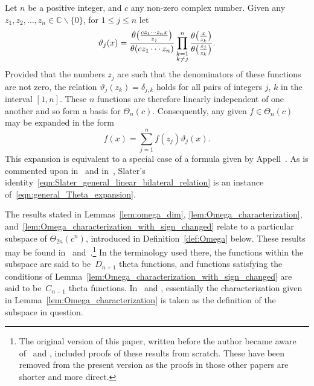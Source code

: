 \documentclass[10pt,a4paper]{amsart}
\numberwithin{equation}{section}
\newcommand{\C}{\mathbb{C}}
\begin{document}
\begin{Remark} \label{rmk:Slater_general_linear_bilateral_relation}
Let $n$ be a positive integer, and $c$ any non-zero complex number. Given any $z_1,z_2,\dots,z_n \in \C \backslash\{0\}$, for $1 \leq j \leq n$ let
\[ \vartheta_j(x) = {\theta\bigl({cz_1 \cdots z_n x \over z_j}\bigr) \over \theta(cz_1\cdots z_n)} \prod_{\substack{k=1 \\ k \neq j}}^n {\theta\bigl({x \over z_k}\bigr) \over \theta\bigl({z_j \over z_k}\bigr)}. \]
Provided that the numbers $z_j$ are such that the denominators of these functions are not zero, the relation $\vartheta_j(z_k)=\delta_{j,k}$ holds for all pairs of integers $j$, $k$ in the interval $[1,n]$. These $n$ functions are therefore linearly independent of one another and so form a basis for $\Theta_n(c)$. Consequently, any given $f \in \Theta_n(c)$ may be expanded in the form
\begin{equation} \label{eqn:general_Theta_expansion}
f(x) = \sum_{j=1}^n f(z_j) \vartheta_j(x).
\end{equation}
This expansion is equivalent to a special case of a formula given by Appell~\cite[equations~(8) and~($8'$)]{Appell1884}. As is commented upon in~\cite[p.~88]{Bradley-Thrush2023} and in~\cite[Section~5.1]{Ito2008}, Slater's identity~\eqref{eqn:Slater_general_linear_bilateral_relation} is an instance of~\eqref{eqn:general_Theta_expansion}.
\end{Remark}

The results stated in Lemmas~\ref{lem:omega_dim}, \ref{lem:Omega_characterization}, and~\ref{lem:Omega_characterization_with_sign_changed} relate to a particular subspace of $\Theta_{2n}(c^n)$, introduced in Definition~\ref{def:Omega} below. These results may be found in~\cite[Lemma~4.3]{Ito2008} and~\cite[Lemma~3.2]{Rosengren2006}.\footnote{The original version of this paper, written before the author became aware of~\cite{Ito2008} and \cite{Rosengren2006}, included proofs of these results from scratch. These have been removed from the present version as the proofs in those other papers are shorter and more direct.} In the terminology used there, the functions within the subspace are said to be~$D_{n+1}$ theta functions, and functions satisfying the conditions of Lemma~\ref{lem:Omega_characterization_with_sign_changed} are said to be~$C_{n-1}$ theta functions. In~\cite{Ito2008} and \cite{Rosengren2006}, essentially the characterization given in Lemma~\ref{lem:Omega_characterization} is taken as the definition of the subspace in question.
\end{document}
